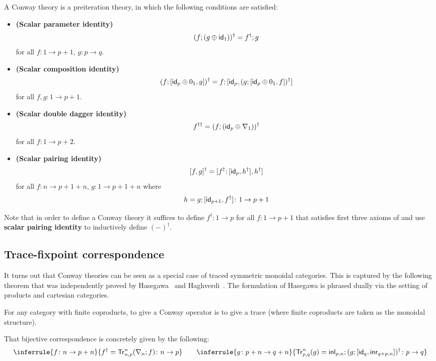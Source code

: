 
\begin{definition}\label{def:conway_theory}
	A Conway theory is a preiteration theory, in which the following conditions are satisfied:
	\begin{itemize}
		\item[] \textbf{(Scalar parameter identity)} $$(f ; (g \oplus \mathsf{id}_1))^\dagger = f^\dagger ; g$$ for all $f \colon 1 \to p + 1$, $g \colon p \to q$.
		\item[] \textbf{(Scalar composition identity)} 
		$$
		(f ; [ \mathsf{id}_p\oplus0_1, g ])^\dagger = f ; [ \mathsf{id}_p,  (g ;  [ \mathsf{id}_p \oplus 0_1 , f])^\dagger]
		$$ for all $f,g \colon 1 \to p + 1$.
		\item[] \textbf{(Scalar double dagger identity)} 
		$$f^{\dagger\dagger} = (f ; (\mathsf{id}_p \oplus \nabla_1))^\dagger$$
		for all $f \colon 1 \to p + 2$.
		\item[] \textbf{(Scalar pairing identity)}
		$$[ f ,g ]^\dagger = [ f^\dagger ; [ \mathsf{id}_p, h^\dagger ], h^\dagger ]$$ for all $f \colon n \to p + 1 + n $, $g \colon 1 \to p + 1 + n$ where 
		$$
		h = g ; [ \mathsf{id}_{p + 1}, f^\dagger] \colon 1 \to p + 1
		$$
	\end{itemize}
\end{definition}
\begin{remark}\label{rem:defining_dagger}
	Note that in order to define a Conway theory it suffices to define $f^\dagger \colon 1 \to p$ for all $f \colon 1 \to p + 1$ that satisfies first three axioms of  and use \textbf{scalar pairing identity} to inductively define $(-)^\dagger$.
\end{remark}

\subsection{Trace-fixpoint correspondence}
It turns out that Conway theories can be seen as a special case of traced symmetric monoidal categories. This is captured by the following theorem that was independently proved by Hasegawa~\cite{Hasegawa:1997:Models} and Haghverdi~\cite{Haghverdi:2000:Categorical}. The formulation of Hasegawa is phrased dually via the setting of products and cartesian categories.
\begin{theorem}\label{thm:trace}
For any category with finite coproducts, to give a Conway operator is to give a trace (where finite coproducts are taken as the monoidal structure). 
\end{theorem}
That bijective correspondence is concretely given by the following:
\begin{gather*}
	\inferrule{f \colon  n \to p + n}{f^\dagger = \Tr^n_{n,p} (\nabla_n ; f) \colon n \to p} 
	\qquad
	\inferrule{g \colon p + n \to q + n}{\Tr^{n}_{p,q}(g) = \inl_{p,n} ; (g; \lc\id_q, \inr_{q +p,n} \rc)^\dagger  \colon p \to q}
\end{gather*}	

